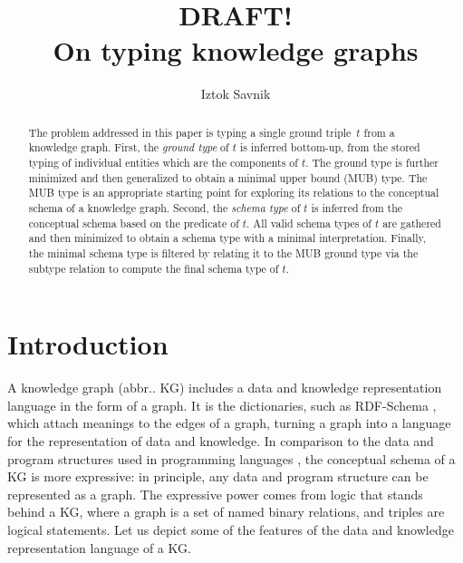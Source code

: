 \documentclass[runningheads]{llncs}
\begin{document}
\title{DRAFT! \\ On typing knowledge graphs}

\author{Iztok Savnik} 



\maketitle

\begin{abstract}
  The problem addressed in this paper is typing a single ground
  triple~$t$ from a knowledge graph. First, the \emph{ground type} of
  $t$ is inferred bottom-up, from the stored typing of individual
  entities which are the components of $t$. The ground type is further
  minimized and then generalized to obtain a minimal upper bound (MUB)
  type. The MUB type is an appropriate starting point for exploring
  its relations to the conceptual schema of a knowledge graph. Second,
  the \emph{schema type} of $t$ is inferred from the conceptual schema
  based on the predicate of $t$. All valid schema types of $t$ are
  gathered and then minimized to obtain a schema type with a minimal
  interpretation. Finally, the minimal schema type is filtered by
  relating it to the MUB ground type via the subtype relation to
  compute the final schema type of $t$.

\end{abstract}


\thispagestyle{headings}




\section{Introduction}

A knowledge graph (abbr.. KG) includes a data and knowledge
representation language in the form of a graph. It is the
dictionaries, such as RDF-Schema \cite{rdfschema}, which attach
meanings to the edges of a graph, turning a graph into a language for
the representation of data and knowledge. In comparison to the data
and program structures used in programming languages
\cite{Pierce2002,Hindley1997}, the conceptual schema of a KG is more
expressive: in principle, any data and program structure can be
represented as a graph. The expressive power comes from logic that
stands behind a KG, where a graph is a set of named binary relations,
and triples are logical statements. Let us depict some of the features
of the data and knowledge representation language of a KG.
\end{document}
